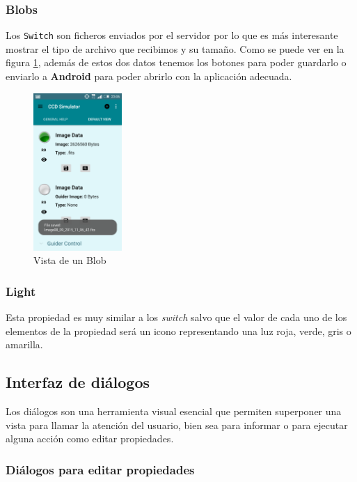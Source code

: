 \bigskip
\subsubsection{Blobs}
Los \texttt{Switch} son ficheros enviados por el servidor por lo que es más interesante mostrar el tipo de archivo que recibimos y su tamaño. Como se puede ver en la figura \ref{fig:blob}, además de estos dos datos tenemos los botones para poder guardarlo o enviarlo a \textbf{Android} para poder abrirlo con la aplicación adecuada.

\bigskip
\begin{figure}[!ht]
  \begin{center}
  \includegraphics[width=0.3\textwidth]{../images/saveBlob2.png}
  \caption{Vista de un Blob}
  \label{fig:blob}
  \end{center}
\end{figure}

\bigskip
\subsubsection{Light}
Esta propiedad es muy similar a los \textit{switch} salvo que el valor de cada uno de los elementos de la propiedad será un icono representando una luz roja, verde, gris o amarilla.


\bigskip
\subsection{Interfaz de diálogos}

Los diálogos son una herramienta visual esencial que permiten superponer una vista para llamar la atención del usuario, bien sea para informar o para ejecutar alguna acción como editar propiedades.


\bigskip
\subsubsection{Diálogos para editar propiedades}

